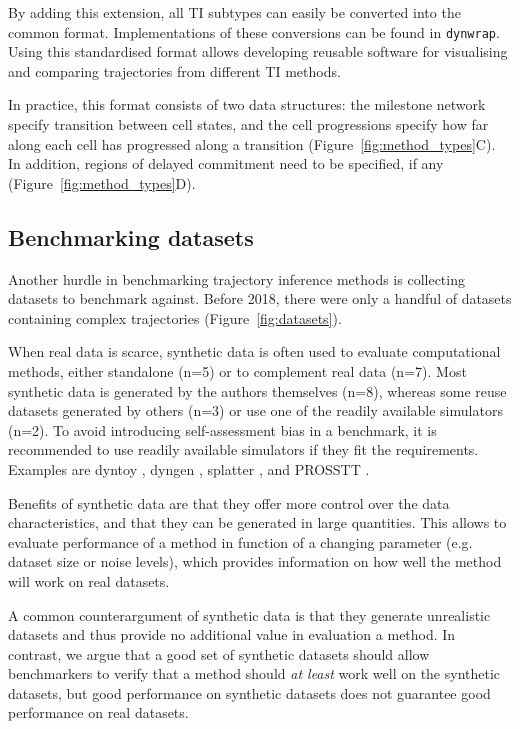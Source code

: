 By adding this extension, all TI subtypes can easily be converted into the common format. Implementations of these conversions can be found in \texttt{dynwrap}\cite{dyno}. Using this standardised format allows developing reusable software for visualising and comparing trajectories from different TI methods.

In practice, this format consists of two data structures: the milestone network specify transition between cell states, and the cell progressions specify how far along each cell has progressed along a transition (Figure~\ref{fig:method_types}C). In addition, regions of delayed commitment need to be specified, if any (Figure~\ref{fig:method_types}D). 


\subsection{Benchmarking datasets}
Another hurdle in benchmarking trajectory inference methods is collecting datasets to benchmark against. Before 2018, there were only a handful of datasets containing complex trajectories (Figure~\ref{fig:datasets}). 

When real data is scarce, synthetic data is often used to evaluate computational methods, either standalone (n=5) or to complement real data (n=7). Most synthetic data is generated by the authors themselves (n=8), whereas some reuse datasets generated by others (n=3) or use one of the readily available simulators (n=2). To avoid introducing self-assessment bias in a benchmark, it is recommended to use readily available simulators if they fit the requirements. Examples are dyntoy \cite{saelens_comparisonsinglecelltrajectory_2019}, dyngen \cite{dyngen}, splatter \cite{zappia_splattersimulationsinglecell_2017}, and PROSSTT \cite{papadopoulos_prossttprobabilisticsimulation_2018}.

Benefits of synthetic data are that they offer more control over the data characteristics, and that they can be generated in large quantities. This allows to evaluate performance of a method in function of a changing parameter (e.g. dataset size or noise levels), which provides information on how well the method will work on real datasets.

A common counterargument of synthetic data is that they generate unrealistic datasets and thus provide no additional value in evaluation a method. In contrast, we argue that a good set of synthetic datasets should allow benchmarkers to verify that a method should \textit{at least} work well on the synthetic datasets, but good performance on synthetic datasets does not guarantee good performance on real datasets.

